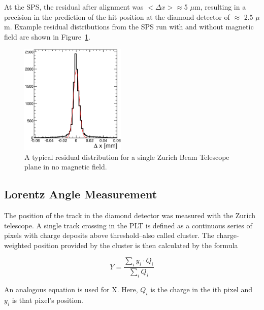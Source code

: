 \documentclass[journal]{IEEEtran}
\begin{document}
At the SPS, the residual after alignment was $<\Delta x> \approx$5 $\mu$m, resulting in a precision in the prediction of the hit position at the diamond detector of $\approx$ 2.5 $\mu$m.  Example residual distributions from the SPS run with and without magnetic field are shown in Figure~\ref{fig:bt_residuals}.

\begin{figure}[!h]
\centering
\includegraphics[width=0.45\textwidth]{bty-example}
\caption{ A typical residual distribution for a single Zurich Beam Telescope plane in no magnetic field. }
\label{fig:bt_residuals}
\end{figure}

\subsection{Lorentz Angle Measurement}


The position of the track in the diamond detector was
measured with the Zurich telescope. 
A single track crossing in the PLT is defined
as a continuous series of pixels with charge deposits above 
threshold--also called cluster. The charge-weighted position provided by the cluster is then calculated by the formula 

\begin{equation}
Y = \frac{\sum_i y_i \cdot Q_i}{\sum_i Q_i}
\end{equation}

An analogous equation is used for X.  Here, $Q_i$ is the charge in the ith pixel and $y_i$ is that pixel's position.
\end{document}
